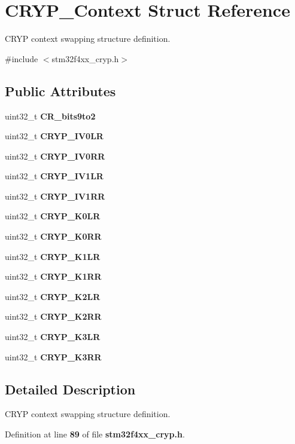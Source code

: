 \section{C\+R\+Y\+P\+\_\+\+Context Struct Reference}
\label{structCRYP__Context}


C\+R\+YP context swapping structure definition.  




{\ttfamily \#include $<$stm32f4xx\+\_\+cryp.\+h$>$}

\subsection*{Public Attributes}
\begin{DoxyCompactItemize}
\item 
uint32\+\_\+t \textbf{ C\+R\+\_\+bits9to2}
\item 
uint32\+\_\+t \textbf{ C\+R\+Y\+P\+\_\+\+I\+V0\+LR}
\item 
uint32\+\_\+t \textbf{ C\+R\+Y\+P\+\_\+\+I\+V0\+RR}
\item 
uint32\+\_\+t \textbf{ C\+R\+Y\+P\+\_\+\+I\+V1\+LR}
\item 
uint32\+\_\+t \textbf{ C\+R\+Y\+P\+\_\+\+I\+V1\+RR}
\item 
uint32\+\_\+t \textbf{ C\+R\+Y\+P\+\_\+\+K0\+LR}
\item 
uint32\+\_\+t \textbf{ C\+R\+Y\+P\+\_\+\+K0\+RR}
\item 
uint32\+\_\+t \textbf{ C\+R\+Y\+P\+\_\+\+K1\+LR}
\item 
uint32\+\_\+t \textbf{ C\+R\+Y\+P\+\_\+\+K1\+RR}
\item 
uint32\+\_\+t \textbf{ C\+R\+Y\+P\+\_\+\+K2\+LR}
\item 
uint32\+\_\+t \textbf{ C\+R\+Y\+P\+\_\+\+K2\+RR}
\item 
uint32\+\_\+t \textbf{ C\+R\+Y\+P\+\_\+\+K3\+LR}
\item 
uint32\+\_\+t \textbf{ C\+R\+Y\+P\+\_\+\+K3\+RR}
\end{DoxyCompactItemize}


\subsection{Detailed Description}
C\+R\+YP context swapping structure definition. 

Definition at line \textbf{ 89} of file \textbf{ stm32f4xx\+\_\+cryp.\+h}.



